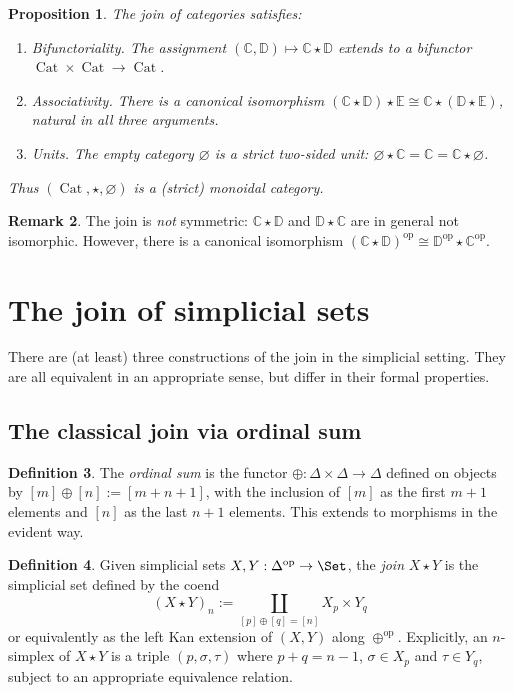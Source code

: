 \documentclass{article}
\newtheorem{proposition}{Proposition}
\theoremstyle{definition}
\newtheorem{definition}[proposition]{Definition}
\newtheorem{remark}[proposition]{Remark}
\newcommand{\C}{\mathbb{C}}
\newcommand{\D}{\mathbb{D}}
\newcommand{\E}{\mathbb{E}}
\DeclareMathOperator{\Cat}{Cat}
\begin{document}
\begin{proposition}\label{join-cat-props}
	The join of categories satisfies:
	\begin{enumerate}
		\item \emph{Bifunctoriality.} The assignment $(\C,\D) \mapsto \C \star \D$ extends to a bifunctor $\Cat \times \Cat \to \Cat$.
		\item \emph{Associativity.} There is a canonical isomorphism $(\C \star \D) \star \E \cong \C \star (\D \star \E)$, natural in all three arguments.
		\item \emph{Units.} The empty category $\varnothing$ is a strict two-sided unit: $\varnothing \star \C = \C = \C \star \varnothing$.
	\end{enumerate}
	Thus $(\Cat, \star, \varnothing)$ is a (strict) monoidal category.
\end{proposition}

\begin{remark}\label{join-not-symmetric}
	The join is \emph{not} symmetric: $\C \star \D$ and $\D \star \C$ are in general not isomorphic. However, there is a canonical isomorphism $(\C \star \D)^{\mathrm{op}} \cong \D^{\mathrm{op}} \star \C^{\mathrm{op}}$.
\end{remark}

\section{The join of simplicial sets}

There are (at least) three constructions of the join in the simplicial setting. They are all equivalent in an appropriate sense, but differ in their formal properties.

\subsection{The classical join via ordinal sum}

\begin{definition}\label{ordinal-sum}
	The \emph{ordinal sum} is the functor $\oplus : \Delta \times \Delta \to \Delta$ defined on objects by $[m] \oplus [n] := [m + n + 1]$, with the inclusion of $[m]$ as the first $m+1$ elements and $[n]$ as the last $n+1$ elements. This extends to morphisms in the evident way.
\end{definition}

\begin{definition}\label{join-sset}
	Given simplicial sets $X, Y : \Delta^{\mathrm{op}} \to \Set$, the \emph{join} $X \star Y$ is the simplicial set defined by the coend
	\[(X \star Y)_n := \coprod_{[p] \oplus [q] = [n]} X_p \times Y_q\]
	or equivalently as the left Kan extension of $(X,Y)$ along $\oplus^{\mathrm{op}}$. Explicitly, an $n$-simplex of $X \star Y$ is a triple $(p, \sigma, \tau)$ where $p + q = n - 1$, $\sigma \in X_p$ and $\tau \in Y_q$, subject to an appropriate equivalence relation.
\end{definition}
\end{document}
